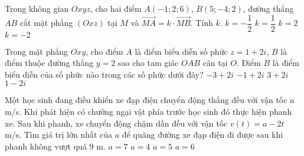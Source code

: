 \begin{ex}%
	Trong không gian $Oxyz$, cho hai điểm $A(-1;2;6)$, $B(5;-4;2)$, đường thẳng $AB$ cắt mặt phẳng $(Oxz)$ tại $M$ và $\vec{MA}=k\cdot \vec{MB}$. Tính $k$.
	\choice%
	{\True $k=-\dfrac{1}{2}$}
	{$k=\dfrac{1}{2}$}
	{$k=2$}
	{$k=-2$}
\end{ex}

\begin{ex}%
	Trong mặt phẳng $Oxy$, cho điểm $A$ là điểm biểu diễn số phức $z=1+2i$, $B$ là điểm thuộc đường thẳng $y=2$ sao cho tam giác $OAB$ cân tại $O$. Điểm $B$ là điểm biểu diễn của số phức nào trong các số phức dưới đây?
	\choice%
	{$-3+2i$}
	{\True $-1+2i$}
	{$3+2i$}
	{$1-2i$}
\end{ex}

\begin{ex}%
	Một học sinh đang điều khiển xe đạp điện chuyển động thẳng đều với vận tốc $a$ m/s. Khi phát hiện có chướng ngại vật phía trước học sinh đó thực hiện phanh xe. Sau khi phanh, xe chuyển động chậm dần đều với vận tốc $v(t)=a-2t$ m/s. Tìm giá trị lớn nhất của $a$ để quãng đường xe đạp điện đi được sau khi phanh không vượt quá $9$ m.
	\choice%
	{$a=7$}
	{$a=4$}
	{$a=5$}
	{\True $a=6$}
\end{ex}


